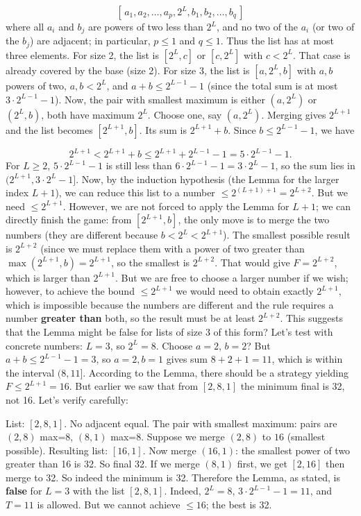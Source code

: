 \documentclass{llmxive}
\begin{document}
\[
    [\, a_1, a_2, \dots, a_p, 2^{L}, b_1, b_2, \dots, b_q \,]
    \]
where all \(a_i\) and \(b_j\) are powers of two less than \(2^{L}\), and no two of the \(a_i\) (or two of the \(b_j\)) are adjacent; in particular, \(p \le 1\) and \(q \le 1\). Thus the list has at most three elements. For size 2, the list is \([2^{L}, c]\) or \([c, 2^{L}]\) with \(c < 2^{L}\). That case is already covered by the base (size 2). For size 3, the list is \([a, 2^{L}, b]\) with \(a,b\) powers of two, \(a,b < 2^{L}\), and \(a+b \le 2^{L-1} - 1\) (since the total sum is at most \(3 \cdot 2^{L-1} - 1\)). Now, the pair with smallest maximum is either \((a,2^{L})\) or \((2^{L},b)\), both have maximum \(2^{L}\). Choose one, say \((a,2^{L})\). Merging gives \(2^{L+1}\) and the list becomes \([2^{L+1}, b]\). Its sum is \(2^{L+1} + b\). Since \(b \le 2^{L-1} - 1\), we have\par
\[
    2^{L+1} < 2^{L+1} + b \le 2^{L+1} + 2^{L-1} - 1 = 5 \cdot 2^{L-1} - 1.
    \]
For \(L \ge 2\), \(5 \cdot 2^{L-1} - 1\) is still less than \(6 \cdot 2^{L-1} - 1 = 3 \cdot 2^{L} - 1\), so the sum lies in \((2^{L+1}, 3 \cdot 2^{L} - 1]\). Now, by the induction hypothesis (the Lemma for the larger index \(L+1\)), we can reduce this list to a number \(\le 2^{(L+1)+1} = 2^{L+2}\). But we need \(\le 2^{L+1}\). However, we are not forced to apply the Lemma for \(L+1\); we can directly finish the game: from \([2^{L+1}, b]\), the only move is to merge the two numbers (they are different because \(b < 2^{L} < 2^{L+1}\)). The smallest possible result is \(2^{L+2}\) (since we must replace them with a power of two greater than \(\max(2^{L+1}, b) = 2^{L+1}\), so the smallest is \(2^{L+2}\). That would give \(F = 2^{L+2}\), which is larger than \(2^{L+1}\). But we are free to choose a larger number if we wish; however, to achieve the bound \(\le 2^{L+1}\) we would need to obtain exactly \(2^{L+1}\), which is impossible because the numbers are different and the rule requires a number \textbf{greater than} both, so the result must be at least \(2^{L+2}\). This suggests that the Lemma might be false for lists of size 3 of this form? Let's test with concrete numbers: \(L=3\), so \(2^{L}=8\). Choose \(a=2\), \(b=2\)? But \(a+b \le 2^{L-1} - 1 = 3\), so \(a=2,b=1\) gives sum \(8+2+1=11\), which is within the interval \((8, 11]\). According to the Lemma, there should be a strategy yielding \(F \le 2^{L+1}=16\). But earlier we saw that from \([2,8,1]\) the minimum final is 32, not 16. Let's verify carefully:\par
List: \([2,8,1]\). No adjacent equal. The pair with smallest maximum: pairs are \((2,8)\) max=8, \((8,1)\) max=8. Suppose we merge \((2,8)\) to \(16\) (smallest possible). Resulting list: \([16,1]\). Now merge \((16,1)\): the smallest power of two greater than 16 is 32. So final 32. If we merge \((8,1)\) first, we get \([2,16]\) then merge to 32. So indeed the minimum is 32. Therefore the Lemma, as stated, is \textbf{false} for \(L=3\) with the list \([2,8,1]\). Indeed, \(2^{L}=8\), \(3 \cdot 2^{L-1} - 1 = 11\), and \(T=11\) is allowed. But we cannot achieve \(\le 16\); the best is 32.\par
\end{document}
